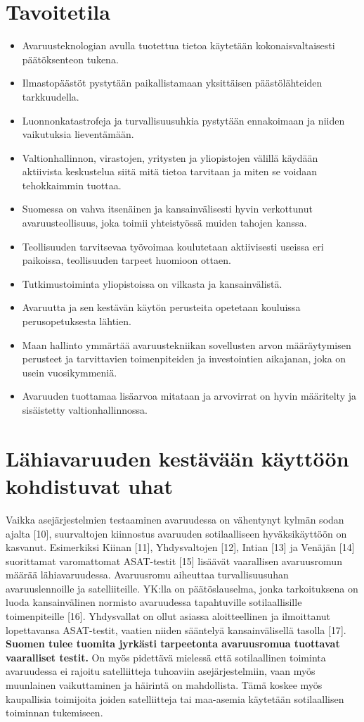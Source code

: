 \documentclass[nobib,finnish,oneside,openany,notoc,a4paper]{tufte-book}
\begin{document}
\chapter{Tavoitetila}

\begin{itemize}
\item Avaruusteknologian avulla tuotettua
tietoa käytetään kokonaisvaltaisesti päätöksenteon tukena.
\item Ilmastopäästöt pystytään paikallistamaan yksittäisen päästölähteiden
tarkkuudella.
\item Luonnonkatastrofeja ja turvallisuusuhkia pystytään
ennakoimaan ja niiden vaikutuksia lieventämään.
\item Valtionhallinnon, virastojen, yritysten ja yliopistojen välillä käydään aktiivista
keskustelua siitä mitä tietoa tarvitaan ja miten se voidaan tehokkaimmin
tuottaa.
\item Suomessa on vahva itsenäinen ja kansainvälisesti hyvin
verkottunut avaruusteollisuus, joka toimii yhteistyössä muiden tahojen
kanssa.
\item Teollisuuden tarvitsevaa työvoimaa koulutetaan aktiivisesti
useissa eri paikoissa, teollisuuden tarpeet huomioon ottaen.
\item Tutkimustoiminta yliopistoissa on vilkasta ja kansainvälistä.
\item Avaruutta ja sen kestävän käytön perusteita opetetaan kouluissa perusopetuksesta
lähtien.
\item Maan hallinto ymmärtää avaruustekniikan sovellusten arvon
määräytymisen perusteet ja tarvittavien toimenpiteiden ja investointien
aikajanan, joka on usein vuosikymmeniä.
\item Avaruuden tuottamaa lisäarvoa mitataan ja arvovirrat on hyvin määritelty ja sisäistetty valtionhallinnossa.
\end{itemize}

\chapter{Lähiavaruuden kestävään käyttöön kohdistuvat uhat}

Vaikka asejärjestelmien testaaminen avaruudessa on vähentynyt kylmän
sodan ajalta {[}10{]}, suurvaltojen kiinnostus avaruuden sotilaalliseen
hyväksikäyttöön on kasvanut. Esimerkiksi Kiinan {[}11{]}, Yhdysvaltojen
{[}12{]}, Intian {[}13{]} ja Venäjän {[}14{]} suorittamat varomattomat
ASAT-testit {[}15{]} lisäävät vaarallisen avaruusromun määrää
lähiavaruudessa. Avaruusromu aiheuttaa turvallisuusuhan avaruuslennoille
ja satelliiteille. YK:lla on päätöslauselma, jonka tarkoituksena on
luoda kansainvälinen normisto avaruudessa tapahtuville sotilaallisille
toimenpiteille {[}16{]}. Yhdysvallat on ollut asiassa aloitteellinen ja
ilmoittanut lopettavansa ASAT-testit, vaatien niiden sääntelyä
kansainvälisellä tasolla {[}17{]}. \textbf{Suomen tulee tuomita jyrkästi
tarpeetonta avaruusromua tuottavat vaaralliset testit. }On myös
pidettävä mielessä että sotilaallinen toiminta avaruudessa ei rajoitu
satelliitteja tuhoaviin asejärjestelmiin, vaan myös muunlainen
vaikuttaminen ja häirintä on mahdollista. Tämä koskee myös kaupallisia
toimijoita joiden satelliitteja tai maa-asemia käytetään sotilaallisen
toiminnan tukemiseen.
\end{document}
